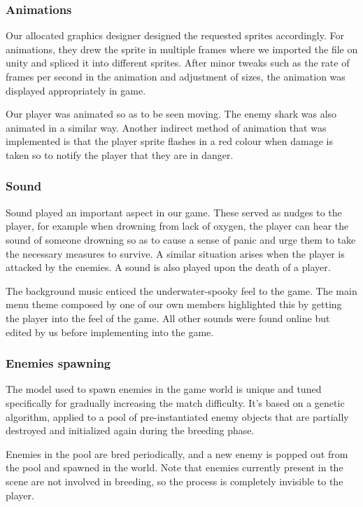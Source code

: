 \documentclass[11pt]{article}
\begin{document}
\subsubsection{Animations}
Our allocated graphics designer designed the requested sprites accordingly. For animations, they drew the sprite in multiple frames where we imported the file on unity and spliced it into different sprites. After minor tweaks such as the rate of frames per second in the animation and adjustment of sizes, the animation was displayed appropriately in game.

Our player was animated so as to be seen moving. The enemy shark was also animated in a similar way. Another indirect method of animation that was implemented is that the player sprite flashes in a red colour when damage is taken so to notify the player that they are in danger.

\subsubsection{Sound}
Sound played an important aspect in our game. These served as nudges to the player, for example when drowning from lack of oxygen, the player can hear the sound of someone drowning so as to cause a sense of panic and urge them to take the necessary measures to survive. A similar situation arises when the player is attacked by the enemies. A sound is also played upon the death of a player.

The background music enticed the underwater-spooky feel to the game. The main menu theme composed by one of our own members highlighted this by getting the player into the feel of the game. All other sounds were found online but edited by us before implementing into the game.

\subsubsection{Enemies spawning}
The model used to spawn enemies in the game world is unique and tuned specifically for gradually increasing the match difficulty. It’s based on a genetic algorithm, applied to a pool of pre-instantiated enemy objects that are partially destroyed and initialized again during the breeding phase.

Enemies in the pool are bred periodically, and a new enemy is popped out from the pool and spawned in the world. Note that enemies currently present in the scene are not involved in breeding, so the process is completely invisible to the player.
\end{document}
